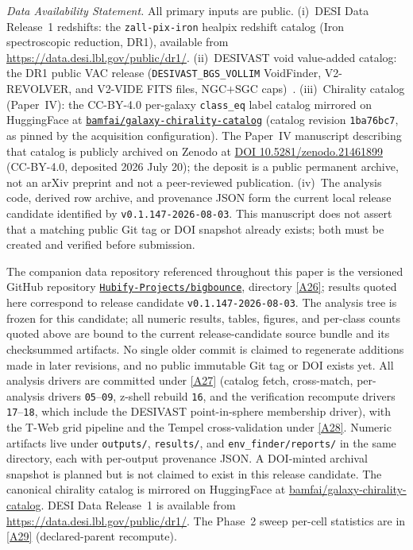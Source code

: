 \documentclass[twocolumn,linenumbers]{aastex702}
\newcommand{\repoBase}{https://github.com/Hubify-Projects/bigbounce/blob/main}
\newcommand{\paperVersion}{v0.1.147-2026-08-03}
\begin{document}
\emph{Data Availability Statement.} All primary inputs are public.
(i)~DESI Data Release~1 redshifts: the \texttt{zall-pix-iron} healpix
redshift catalog (Iron spectroscopic reduction, DR1), available from
\url{https://data.desi.lbl.gov/public/dr1/}.
(ii)~DESIVAST void value-added catalog: the DR1 public VAC release
(\texttt{DESIVAST\_BGS\_VOLLIM} VoidFinder, V2-REVOLVER, and V2-VIDE
FITS files, NGC$+$SGC caps)~\cite{DESIVAST2025}.
(iii)~Chirality catalog (Paper~IV): the CC-BY-4.0 per-galaxy
\texttt{class\_eq} label catalog mirrored on HuggingFace at
\href{https://huggingface.co/datasets/bamfai/galaxy-chirality-catalog}%
{\texttt{bamfai/galaxy-chirality-catalog}} (catalog revision
\texttt{1ba76bc7}, as pinned by the acquisition configuration). The Paper~IV
manuscript describing that catalog is publicly archived on Zenodo at
\href{https://doi.org/10.5281/zenodo.21461899}{DOI 10.5281/zenodo.21461899}
(CC-BY-4.0, deposited 2026 July 20); the deposit is a public permanent
archive, not an arXiv preprint and not a peer-reviewed publication.
(iv)~The analysis code, derived row archive, and provenance JSON form the
current local release candidate identified by \texttt{\paperVersion}.
This manuscript does not assert that a
matching public Git tag or DOI snapshot already exists; both must be
created and verified before submission.

The companion data repository referenced throughout this paper is the
versioned GitHub repository
\href{https://github.com/Hubify-Projects/bigbounce}%
{\texttt{Hubify-Projects/bigbounce}}, directory
\href{\repoBase/pipelines/p5\_desi\_chirality/}{[A26]}; results quoted here
correspond to release candidate \texttt{\paperVersion}. The analysis
tree is frozen for this candidate; all numeric results, tables,
figures, and per-class counts quoted above are bound to the current
release-candidate source bundle and its checksummed artifacts. No single
older commit is claimed to regenerate additions made in later revisions,
and no public immutable Git tag or DOI exists yet. All analysis
drivers are committed under
\href{\repoBase/pipelines/p5\_desi\_chirality/scripts/}{[A27]} (catalog fetch,
cross-match, per-analysis drivers \texttt{05}--\texttt{09}, z-shell
rebuild \texttt{16}, and the verification recompute drivers
\texttt{17}--\texttt{18}, which include the DESIVAST point-in-sphere
membership driver), with the T-Web grid pipeline and the Tempel
cross-validation under
\href{\repoBase/pipelines/p5\_desi\_chirality/env\_finder/}{[A28]}. Numeric
artifacts live under \texttt{outputs/}, \texttt{results/}, and
\texttt{env\_finder/reports/} in the same directory, each with
per-output provenance JSON. A DOI-minted archival snapshot is planned
but is not claimed to exist in this release candidate. The canonical chirality
catalog is mirrored on HuggingFace at
\href{https://huggingface.co/datasets/bamfai/galaxy-chirality-catalog}%
{bamfai/galaxy-chirality-catalog}. DESI Data Release~1 is available from
\url{https://data.desi.lbl.gov/public/dr1/}. The Phase~2 sweep
per-cell statistics are in
\href{\repoBase/pipelines/p5\_desi\_chirality/env\_finder/reports/02\_phase2\_sweep.csv}{[A29]}
(declared-parent recompute).
\end{document}

